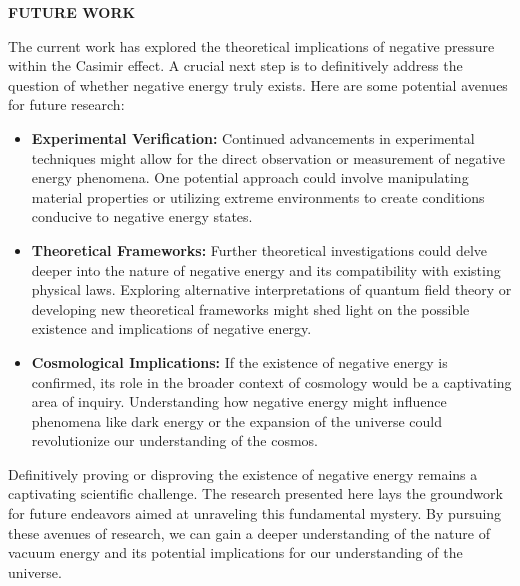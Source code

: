 \noindent\textbf{FUTURE WORK}


The current work has explored the theoretical implications of negative pressure within the Casimir effect. 
A crucial next step is to definitively address the question of whether negative energy truly exists. 
Here are some potential avenues for future research:
\begin{itemize}
    \item \textbf{Experimental Verification:} 
    Continued advancements in experimental techniques might allow for the direct observation 
    or measurement of negative energy phenomena. 
    One potential approach could involve manipulating material properties or utilizing extreme environments 
    to create conditions conducive to negative energy states.
    \item \textbf{Theoretical Frameworks:} 
    Further theoretical investigations could delve deeper into the nature of negative energy and 
    its compatibility with existing physical laws. 
    Exploring alternative interpretations of quantum field theory or developing new theoretical 
    frameworks might shed light on the possible existence and implications of negative energy.
    \item \textbf{Cosmological Implications:} 
    If the existence of negative energy is confirmed, 
    its role in the broader context of cosmology would be a captivating area of inquiry. 
    Understanding how negative energy might influence phenomena like dark energy or the expansion of 
    the universe could revolutionize our understanding of the cosmos.
\end{itemize}

Definitively proving or disproving the existence of negative energy remains a captivating scientific challenge. 
The research presented here lays the groundwork for future endeavors aimed at unraveling this fundamental mystery. 
By pursuing these avenues of research, we can gain a deeper understanding of the nature 
of vacuum energy and its potential implications for our understanding of the universe.\\
